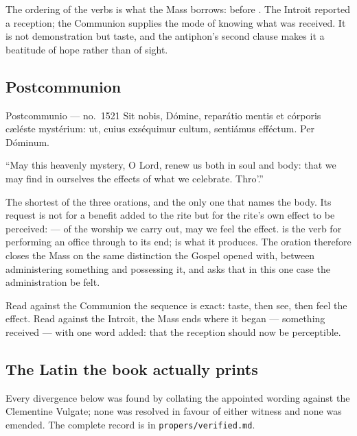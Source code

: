 The ordering of the verbs is what the Mass borrows:  before
. The Introit reported a reception; the Communion supplies the
mode of knowing what was received. It is not demonstration but taste, and the
antiphon's second clause makes it a beatitude of hope rather than of sight.

\subsection{Postcommunion }

\begin{appointed}{Postcommunio --- no.\ 1521}
Sit nobis, Dómine, reparátio mentis et córporis cæléste mystérium: ut, cuius
exséquimur cultum, sentiámus efféctum. Per Dóminum.
\end{appointed}

\begin{englishwitness}
``May this heavenly mystery, O Lord, renew us both in soul and body: that we may
find in ourselves the effects of what we celebrate. Thro'.''
\end{englishwitness}

The shortest of the three orations, and the only one that names the body. Its
request is not for a benefit added to the rite but for the rite's own effect to
be perceived:  --- of the
worship we carry out, may we feel the effect.  is the verb for
performing an office through to its end;  is what it produces.
The oration therefore closes the Mass on the same distinction the Gospel opened
with, between administering something and possessing it, and asks that in this
one case the administration be felt.

Read against the Communion the sequence is exact: taste, then see, then feel the
effect. Read against the Introit, the Mass ends where it began --- something
received --- with one word added: that the reception should now be perceptible.

\subsection{The Latin the book actually prints}

Every divergence below was found by collating the appointed wording against the
Clementine Vulgate; none was resolved in favour of either witness and none was
emended. The complete record is in \texttt{propers/verified.md}.

